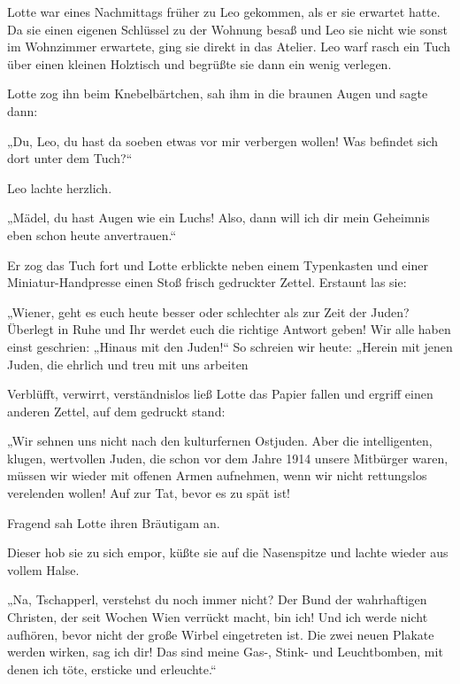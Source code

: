 Lotte war eines Nachmittags früher zu Leo gekommen, als er sie
erwartet hatte. Da sie einen eigenen  Schlüssel zu
der Wohnung besaß und Leo sie nicht wie sonst im Wohnzimmer
erwartete, ging sie direkt in das Atelier. Leo warf rasch ein Tuch
über einen kleinen Holztisch und begrüßte sie dann ein wenig
verlegen.

Lotte zog ihn beim Knebelbärtchen, sah ihm in die braunen Augen und
sagte dann:

„Du, Leo, du hast da soeben etwas vor mir verbergen wollen! Was
befindet sich dort unter dem Tuch?“

Leo lachte herzlich.

„Mädel, du hast Augen wie ein Luchs! Also, dann will ich dir mein
Geheimnis eben schon heute anvertrauen.“

Er zog das Tuch fort und Lotte erblickte neben einem Typenkasten
und einer Miniatur-Handpresse einen Stoß frisch gedruckter Zettel.
Erstaunt las sie:

„Wiener, geht es euch heute besser oder schlechter als zur Zeit der
Juden? Überlegt in Ruhe und Ihr werdet euch die richtige Antwort
geben! Wir alle haben einst geschrien: „Hinaus mit den Juden!“ So
schreien wir heute: „Herein mit jenen Juden, die ehrlich und treu
mit uns arbeiten 


Verblüfft, verwirrt, verständnislos ließ Lotte das Papier fallen
und ergriff einen anderen Zettel, auf dem gedruckt stand:

„Wir sehnen uns nicht nach den kulturfernen Ostjuden. Aber die
intelligenten, klugen, wertvollen Juden, die schon vor dem Jahre
1914 unsere Mitbürger waren, müssen  wir wieder mit
offenen Armen aufnehmen, wenn wir nicht rettungslos verelenden
wollen! Auf zur Tat, bevor es zu spät ist!


Fragend sah Lotte ihren Bräutigam an.

Dieser hob sie zu sich empor, küßte sie auf die Nasenspitze und
lachte wieder aus vollem Halse.

„Na, Tschapperl, verstehst du noch immer nicht? Der Bund der
wahrhaftigen Christen, der seit Wochen Wien verrückt macht, bin
ich! Und ich werde nicht aufhören, bevor nicht der große Wirbel
eingetreten ist. Die zwei neuen Plakate werden wirken, sag ich dir!
Das sind meine Gas-, Stink- und Leuchtbomben, mit denen ich töte,
ersticke und erleuchte.“

